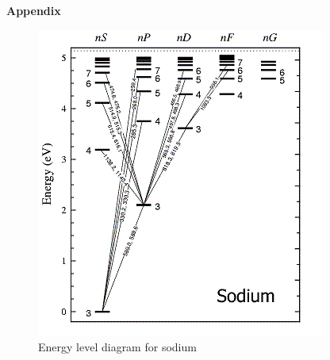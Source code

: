 \documentclass[a4paper,12pt]{article}
\begin{document}
\textbf{Appendix}
\begin{figure}[h!]
\centering
\includegraphics[width=0.7\linewidth, height=0.5\textheight]{Capture}
\caption{Energy level diagram for sodium}
\label{fig:Capture}
\end{figure}
\end{document}
